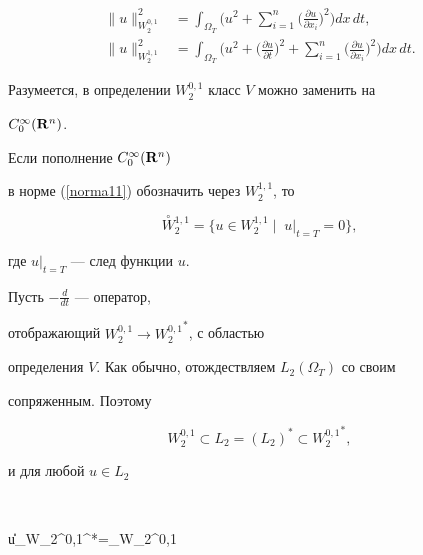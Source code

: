 \begin{equation}


\begin{split}


\| u\|^2_{W_2^{0,1}}&=\int_{\Omega_T}\bigg(u^2+


\sum_{i=1}^n \bigg(\frac{\partial u}{\partial x_i}


\bigg)^2 \bigg)dx\,dt, \\


%


\| u\|^2_{W_2^{1,1}}&=\int_{\Omega_T}\bigg(u^2+


\bigg(\frac{\partial u}{\partial t}\bigg)^2+


\sum_{i=1}^n\bigg(\frac{\partial u}{\partial x_i}


\bigg)^2\bigg)dx\,dt. \label{norma11}


\end{split}


\end{equation}


Разумеется, в определении $W_2^{0,1}$ класс $V$ можно заменить на 


$C_0^\infty ({\bold R}^n)$.


Если пополнение $C_0^\infty ({\bold R}^n)$


в норме (\ref{norma11}) обозначить через $W_2^{1,1}$, то


$$


\overset{\circ}{W}{}_2^{1,1} =\{ u\in W_2^{1,1}\mid\; u|_{t=T}=0\},


$$


где $u|_{t=T}$ --- след функции $u$.





Пусть $-\frac{d}{dt}$ --- оператор, 


отображающий $W_2^{0,1} \to {W_2^{0,1}}^*$, с областью 


определения $V$. Как обычно, отождествляем $L_2(\Omega_T)$ со своим


сопряженным. Поэтому


$$


W_2^{0,1}\subset L_2=(L_2)^*\subset {W_2^{0,1}}^*,


$$


и для любой $u \in L_2$


$$


\| u\|_{{W_2^{0,1}}^*}=\sup_{\varphi \in W_2^{0,1}}




